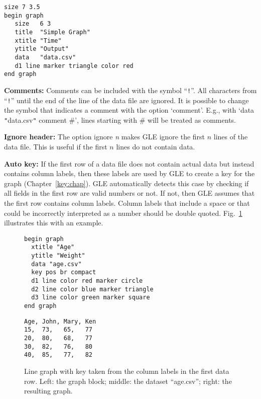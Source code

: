 \begin{commanddescription}
\begin{minipage}[c]{8cm}
\begin{Verbatim}
size 7 3.5
begin graph
   size   6 3
   title  "Simple Graph"
   xtitle "Time"
   ytitle "Output"
   data   "data.csv"
   d1 line marker triangle color red
end graph
\end{Verbatim}
\end{minipage}
\hfill
\begin{minipage}[c]{7cm}
\mbox{}
\end{minipage}

{\bf Comments:} Comments can be included with the symbol ``\verb+!+''. All characters from ``\verb+!+'' until the end of the line of the data file are ignored. It is possible to change the symbol that indicates a comment with the option `comment'. E.g., with `{\sf data \verb+"+data.csv\verb+"+ comment \#}', lines starting with \# will be treated as comments.

{\bf Ignore header:}\label{opt:ignore} The option {\sf ignore {\it n}} makes GLE ignore the first $n$ lines of the data file. This is useful if the first $n$ lines do not contain data.

{\bf Auto key:} If the first row of a data file does not contain actual data but instead contains column labels, then these labels are used by GLE to create a key for the graph (Chapter~\ref{key:chap}). GLE automatically detects this case by checking if all fields in the first row are valid numbers or not. If not, then GLE assumes that the first row contains column labels. Column labels that include a space or that could be incorrectly interpreted as a number should be double quoted. Fig.~\ref{fig:autokey} illustrates this with an example.

\begin{figure}[tb]
\begin{minipage}[t]{6.35cm}%
\begin{Verbatim}
begin graph
  xtitle "Age"
  ytitle "Weight"
  data "age.csv"
  key pos br compact
  d1 line color red marker circle
  d2 line color blue marker triangle
  d3 line color green marker square
end graph
\end{Verbatim}
\end{minipage}
\begin{minipage}[t]{3.5cm}%
\begin{Verbatim}
Age, John, Mary, Ken
15,  73,   65,   77
20,  80,   68,   77
30,  82,   76,   80
40,  85,   77,   82
\end{Verbatim}
\end{minipage}
\begin{minipage}[t]{6cm}%
\vskip0pt%
\mbox{}
\end{minipage}
\caption{\label{fig:autokey}Line graph with key taken from the column labels in the first data row. Left: the graph block; middle: the dataset ``age.csv''; right: the resulting graph.}
\end{figure}


\end{commanddescription}
